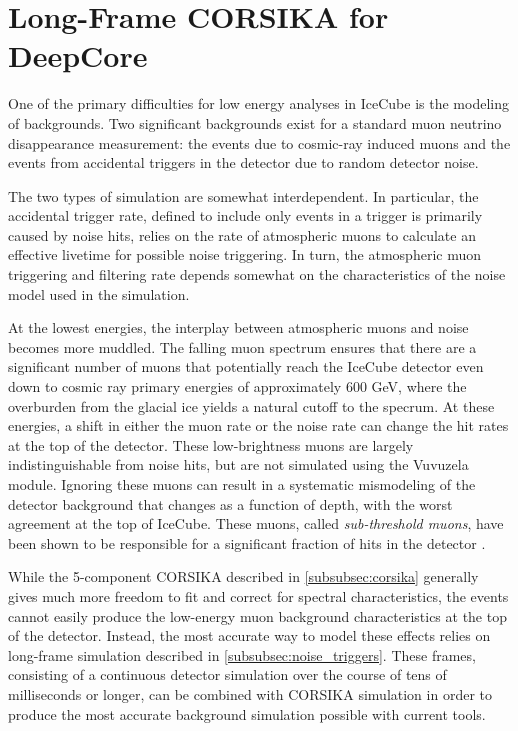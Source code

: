 \section{Long-Frame CORSIKA for DeepCore}
One of the primary difficulties for low energy analyses in IceCube is the modeling of backgrounds.
Two significant backgrounds exist for a standard muon neutrino disappearance measurement: the events due to cosmic-ray induced muons and the events from accidental triggers in the detector due to random detector noise.

The two types of simulation are somewhat interdependent.
In particular, the accidental trigger rate, defined to include only events in a trigger is primarily caused by noise hits, relies on the rate of atmospheric muons to calculate an effective livetime for possible noise triggering.
In turn, the atmospheric muon triggering and filtering rate depends somewhat on the characteristics of the noise model used in the simulation.

At the lowest energies, the interplay between atmospheric muons and noise becomes more muddled.
The falling muon spectrum ensures that there are a significant number of muons that potentially reach the IceCube detector even down to cosmic ray primary energies of approximately 600 GeV, where the overburden from the glacial ice yields a natural cutoff to the specrum.
At these energies, a shift in either the muon rate or the noise rate can change the hit rates at the top of the detector.
These low-brightness muons are largely indistinguishable from noise hits, but are not simulated using the Vuvuzela module.
Ignoring these muons can result in a systematic mismodeling of the detector background that changes as a function of depth, with the worst agreement at the top of IceCube.
These muons, called \emph{sub-threshold muons}, have been shown to be responsible for a significant fraction of hits in the detector \cite{heereman_thesis}.

While the 5-component CORSIKA described in \ref{subsubsec:corsika} generally gives much more freedom to fit and correct for spectral characteristics, the events cannot easily produce the low-energy muon background characteristics at the top of the detector.
Instead, the most accurate way to model these effects relies on long-frame simulation described in \ref{subsubsec:noise_triggers}. 
These frames, consisting of a continuous detector simulation over the course of tens of milliseconds or longer, can be combined with CORSIKA simulation in order to produce the most accurate background simulation possible with current tools.


